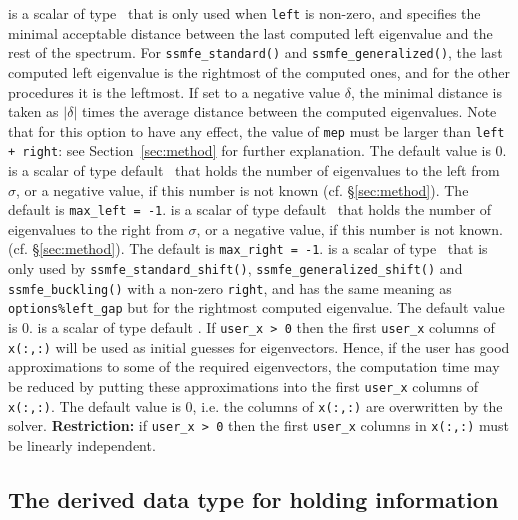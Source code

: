 \begin{description}
%
is a scalar of type \REALDP\ 
that is only used when
{\tt left} is non-zero, and
specifies the minimal acceptable distance
between the last computed left eigenvalue
and the rest of the spectrum.
For {\tt ssmfe\_standard()} and {\tt ssmfe\_generalized()},
the last computed left eigenvalue
is the rightmost of the computed ones,
and for the other procedures
it is the leftmost.
If set to a negative value $\delta$,
the minimal distance is taken as
$|\delta|$ times the average distance between the computed eigenvalues.
Note that for this option to have any effect,
the value of {\tt mep} must be larger than
{\tt left + right}: see Section~\ref{sec:method}
for further explanation.
The default value is 0.
%
is a scalar of type default \Integer\ that
holds the number of eigenvalues to the left from $\sigma$,
or a negative value, if this number is not known
(cf. \S\ref{sec:method}).
The default is {\tt max\_left = -1}.
%
is a scalar of type default \Integer\ that
holds the number of eigenvalues to the right from $\sigma$,
or a negative value, if this number is not known.
(cf. \S\ref{sec:method}).
The default is {\tt max\_right = -1}.
%
is a scalar of type \REALDP\ 
that is only used by 
{\tt ssmfe\_standard\_shift()}, {\tt ssmfe\_generalized\_shift()}
and {\tt ssmfe\_buckling()}
with a non-zero {\tt right}, and
has the same meaning as {\tt options\%left\_gap}
but for the rightmost computed eigenvalue.
The default value is 0.
%
 is a scalar of type default \Integer. 
If {\tt user\_x > 0} then the first {\tt user\_x} columns
of {\tt x(:,:)} will be used as initial guesses for eigenvectors.
Hence, if the user has good approximations
to some of the required eigenvectors, the computation time
may be reduced by putting these approximations
into the first {\tt user\_x} columns of {\tt x(:,:)}.
The default value is 0, 
i.e. the columns of {\tt x(:,:)} are overwritten by the solver.
{\bf Restriction:} if {\tt user\_x > 0} then
the first {\tt user\_x} columns in {\tt x(:,:)}
must be linearly independent.
%
\end{description}

\subsection{The derived data type for holding information}

\label{sec:inform}

